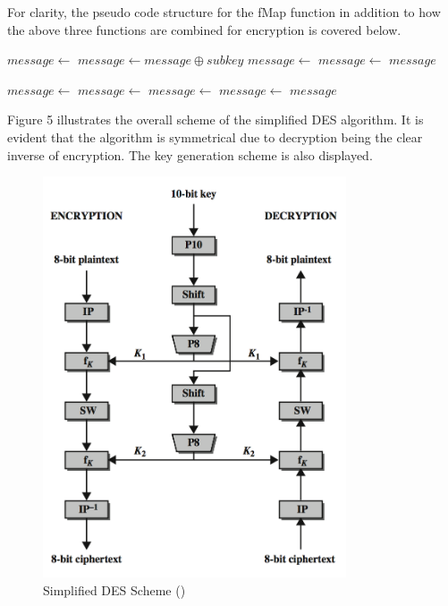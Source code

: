 \documentclass[]{article}
\begin{document}
\vspace{0.5cm}
\noindent
For clarity, the pseudo code structure for the fMap function in addition to how the above three functions are combined for encryption is covered below.
\vspace{0.5cm}
\begin{algorithmic}
	
	\State $message\gets $ 
	\State $ message \gets message \oplus subkey $
	\State $ message \gets $ 	
	\State $message\gets $ 	
	\State \Return $message$
	\EndFunction
\end{algorithmic}

\vspace{0.5cm}
\begin{algorithmic}
	
	\State $message\gets $ 
	\State $message\gets $ 
	\State {}	
	\State $message\gets $ 	
	\State $message\gets $ 
	\State \Return $message$
	\EndFunction
\end{algorithmic}

\newpage
\noindent
Figure 5 illustrates the overall scheme of the simplified DES algorithm. It is evident that the algorithm is symmetrical due to decryption being the clear inverse of encryption. The key generation scheme is also displayed.

\begin{figure}[H]
	\begin{center}
		\includegraphics[height=0.8\textheight,width=0.8\textwidth]{sdes_scheme.png}
		\caption{Simplified DES Scheme (\cite{maintext})}
		\label{fig:des_scheme}		
	\end{center}
\end{figure}
\end{document}

